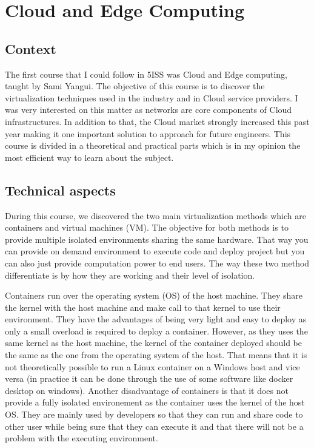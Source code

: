 \section{Cloud and Edge Computing}

\subsection{Context}

The first course that I could follow in 5ISS was Cloud and Edge computing, taught by Sami Yangui. The objective of this course is to discover the virtualization techniques used in the industry and in Cloud service providers. I was very interested on this matter as networks are core components of Cloud infrastructures. In addition to that, the Cloud market strongly increased this past year making it one important solution to approach for future engineers. This course is divided in a theoretical and practical parts which is in my opinion the most efficient way to learn about the subject.

\subsection{Technical aspects}

During this course, we discovered the two main virtualization methods which are containers and virtual machines (VM). The objective for both methods is to provide multiple isolated environments sharing the same hardware. That way you can provide on demand environment to execute code and deploy project but you can also just provide computation power to end users. The way these two method differentiate is by how they are working and their level of isolation. 
\smallskip

Containers run over the operating system (OS) of the host machine. They share the kernel with the host machine and make call to that kernel to use their environment. They have the advantages of being very light and easy to deploy as only a small overload is required to deploy a container. However, as they uses the same kernel as the host machine, the kernel of the container deployed should be the same as the one from the operating system of the host. That means that it is not theoretically possible to run a Linux container on a Windows host and vice versa (in practice it can be done through the use of some software like docker desktop on windows). Another disadvantage of containers is that it does not provide a fully isolated environement as the container uses the kernel of the host OS. They are mainly used by developers so that they can run and share code to other user while being sure that they can execute it and that there will not be a problem with the executing environment.
\smallskip

